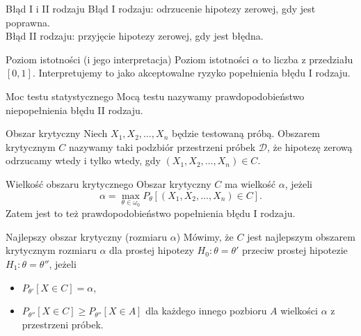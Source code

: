 \documentclass[avery5371, grid, frame]{flashcards}
\begin{document}
\begin{flashcard}[Definicja]{Błąd I i II rodzaju}
    Błąd I rodzaju: odrzucenie hipotezy zerowej, gdy jest poprawna. \\
    Błąd II rodzaju: przyjęcie hipotezy zerowej, gdy jest błędna.
\end{flashcard}

\begin{flashcard}[Definicja]{Poziom istotności (i jego interpretacja)}
    Poziom istotności $\alpha$ to liczba z przedziału $[0, 1]$. Interpretujemy to jako akceptowalne ryzyko popełnienia błędu I rodzaju.
\end{flashcard}

\begin{flashcard}[Definicja]{Moc testu statystycznego}
    Mocą testu nazywamy prawdopodobieństwo niepopełnienia błędu II rodzaju.
\end{flashcard}

\begin{flashcard}[Definicja]{Obszar krytyczny}
    Niech $X_1, X_2, \dots, X_n$ będzie testowaną próbą. Obszarem krytycznym $C$ nazywamy taki podzbiór przestrzeni próbek $\mathcal{D}$, że hipotezę zerową odrzucamy wtedy i tylko wtedy, gdy $(X_1, X_2, \dots, X_n) \in C$.
\end{flashcard}

\begin{flashcard}[Definicja]{Wielkość obszaru krytycznego}
    Obszar krytyczny $C$ ma wielkość $\alpha$, jeżeli $$\alpha = \max_{\theta \in \omega_0} P_\theta [(X_1, X_2, \dots, X_n) \in C].$$ Zatem jest to też prawdopodobieństwo popełnienia błędu I rodzaju.
\end{flashcard}

\begin{flashcard}[Definicja]{Najlepszy obszar krytyczny (rozmiaru $\alpha$)}
    Mówimy, że $C$ jest najlepszym obszarem krytycznym rozmiaru $\alpha$ dla prostej hipotezy $H_0 : \theta = \theta'$ przeciw prostej hipotezie $H_1: \theta = \theta''$, jeżeli
    \begin{itemize}
        \item $P_{\theta'}[X \in C] = \alpha$,
        \item $P_{\theta''}[X \in C] \geq P_{\theta''}[X \in A]$ dla każdego innego pozbioru $A$ wielkości $\alpha$ z przestrzeni próbek.
    \end{itemize}
\end{flashcard}
\end{document}
